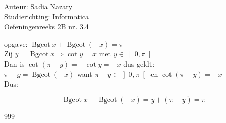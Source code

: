 \documentclass[a4paper]{article}
\DeclareMathOperator{\bgcot}{Bgcot}
\begin{document}
  
\noindent \large Auteur: Sadia Nazary \\
\noindent \large Studierichting: Informatica\\
\noindent \large Oefeningenreeks 2B nr. 3.4\\

\medskip

\normalsize

opgave: $\bgcot x + \bgcot \left(-x\right) = \pi$\\

Zij $y = \bgcot x \Rightarrow \cot y = x$ met $y \in \left]0, \pi\right[$\\

Dan is $\cot (\pi - y) = -\cot y = -x$ dus geldt:\\

$\pi - y = \bgcot(-x)$ want $\pi - y \in \left]0, \pi\right[$ en $\cot(\pi - y) = -x$\\

Dus:

\[
\bgcot x + \bgcot(-x) = y + (\pi - y) = \pi
\]

\begin{thebibliography}{999}
\end{thebibliography}
\end{document}

